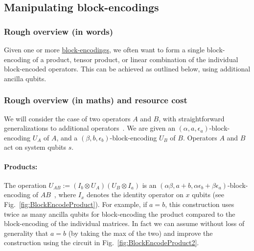 \newpage


\begin{refsection}

\subsection{Manipulating block-encodings}\label{prim:ManipulatingBlockEncodings}


\subsubsection*{Rough overview (in words)}
Given one or more \hyperref[prim:BlockEncodings]{block-encodings}, we often want to form a single block-encoding of a product, tensor product, or linear combination of the individual block-encoded operators. This can be achieved as outlined below, using additional ancilla qubits. 



\subsubsection*{Rough overview (in maths) and resource cost}
We will consider the case of two operators $A$ and $B$, with straightforward generalizations to additional operators~\cite{gilyen2018QSingValTransf}. We are given an $(\alpha, a, \epsilon_a)$-block-encoding $U_A$ of $A$, and a $(\beta, b, \epsilon_b)$-block-encoding $U_B$ of $B$. Operators $A$ and $B$ act on system qubits $s$. 

\paragraph{Products:}
The operation $U_{AB} := (I_b \otimes U_A)(U_B \otimes I_a ) $ is an $(\alpha \beta, a+b, \alpha \epsilon_b + \beta \epsilon_a)$-block-encoding of $AB$~\cite[Lemma 53]{gilyen2018QSingValTransf}, where $I_x$ denotes the identity operator on $x$ qubits (see Fig.~\ref{fig:BlockEncodeProduct}). For example, if $a=b$, this construction uses twice as many ancilla qubits for block-encoding the product compared to the block-encoding of the individual matrices. In fact we can assume without loss of generality that $a=b$ (by taking the max of the two) and improve the construction using the circuit in Fig.~\ref{fig:BlockEncodeProduct2}.


\end{refsection}
